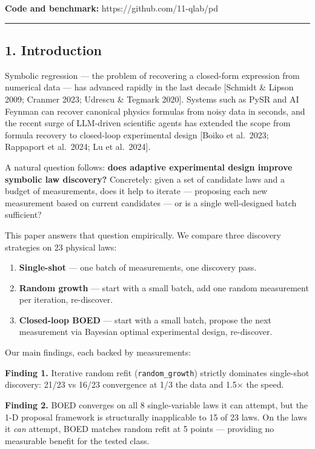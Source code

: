 \documentclass[
]{article}
\providecommand{\tightlist}{%
  \setlength{\itemsep}{0pt}\setlength{\parskip}{0pt}}
\begin{document}
\textbf{Code and benchmark:} https://github.com/11-qlab/pd

\begin{center}\rule{0.5\linewidth}{0.5pt}\end{center}

\subsection{1. Introduction}\label{introduction}

Symbolic regression --- the problem of recovering a closed-form
expression from numerical data --- has advanced rapidly in the last
decade {[}Schmidt \& Lipson 2009; Cranmer 2023; Udrescu \& Tegmark
2020{]}. Systems such as PySR and AI Feynman can recover canonical
physics formulas from noisy data in seconds, and the recent surge of
LLM-driven scientific agents has extended the scope from formula
recovery to closed-loop experimental design {[}Boiko et al.~2023;
Rappaport et al.~2024; Lu et al.~2024{]}.

A natural question follows: \textbf{does adaptive experimental design
improve symbolic law discovery?} Concretely: given a set of candidate
laws and a budget of measurements, does it help to iterate --- proposing
each new measurement based on current candidates --- or is a single
well-designed batch sufficient?

This paper answers that question empirically. We compare three discovery
strategies on 23 physical laws:

\begin{enumerate}
\def\labelenumi{\arabic{enumi}.}
\tightlist
\item
  \textbf{Single-shot} --- one batch of measurements, one discovery
  pass.
\item
  \textbf{Random growth} --- start with a small batch, add one random
  measurement per iteration, re-discover.
\item
  \textbf{Closed-loop BOED} --- start with a small batch, propose the
  next measurement via Bayesian optimal experimental design,
  re-discover.
\end{enumerate}

Our main findings, each backed by measurements:

\textbf{Finding 1.} Iterative random refit (\texttt{random\_growth})
strictly dominates single-shot discovery: 21/23 vs 16/23 convergence at
1/3 the data and 1.5× the speed.

\textbf{Finding 2.} BOED converges on all 8 single-variable laws it can
attempt, but the 1-D proposal framework is structurally inapplicable to
15 of 23 laws. On the laws it \emph{can} attempt, BOED matches random
refit at 5 points --- providing no measurable benefit for the tested
class.
\end{document}
